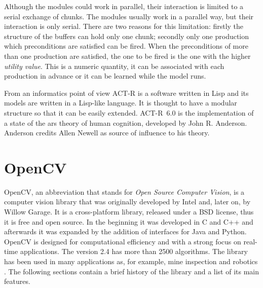 	Although the modules could work in parallel, their interaction is limited to a serial exchange of chunks. The modules usually work in a parallel way, but their interaction is only serial. There are two reasons for this limitation: firstly the structure of the buffers can hold only one chunk; secondly only one production which preconditions are satisfied can be fired. When the preconditions of more than one production are satisfied, the one to be fired is the one with the higher \emph{utility value}. This is a numeric quantity, it can be associated with each production in advance or it can be learned while the model runs.
	
	From an informatics point of view \mbox{ACT-R} is a software written in Lisp and its models are written in a Lisp-like language. It is thought to have a modular structure so that it can be easily extended. \mbox{ACT-R 6.0} is the implementation of a state of the ars theory of human cognition, developed by John R. Anderson. Anderson credits Allen Newell as source of influence to his theory.
	
	
  \section{OpenCV}
	OpenCV, an abbreviation that stands for \emph{Open Source Computer Vision}, is a computer vision library that was originally developed by Intel and, later on, by Willow Garage.
	It is a cross-platform library, released under a BSD license, thus it is free and open source. In the beginning it was developed in C and C++ and afterwards it was expanded by the addition of interfaces for Java and Python. OpenCV is designed for computational efficiency and with a strong focus on real-time applications. The version 2.4 has more than 2500 algorithms. The library has been used in many applications as, for example, mine inspection and robotics \cite{OpenCV:MainWebPage}. The following sections contain a brief history of the library and a list of its main features.
		

